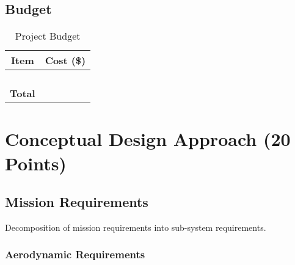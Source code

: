 \documentclass[proposal]{byu-aero}
\begin{document}
\subsection{Budget}
\label{ssec:budget}

\begin{table}[h!]
	\centering
	\caption{Project Budget}
	\label{tab:budget}
	\begin{tabular}{ |c|c| } 
		\hline
		\rowcolor{BYUbluemid}
		Item & Cost (\$) \\ 
		\hline
		&  \\ 
		\hline
		&  \\ 
		\hline
		&  \\ 
		\hline
		&  \\ 
		\hline
		\textbf{Total} & \textbf{} \\ 
		\hline
		
	\end{tabular}
\end{table}



\section{Conceptual Design Approach (20 Points)}
\label{sec:ConceptualDesign}

\subsection{Mission Requirements}
\label{ssec:missionreqs}

Decomposition of mission requirements into sub-system requirements.

\subsubsection{Aerodynamic Requirements}
\label{sssec:aeroreqs}
\end{document}
